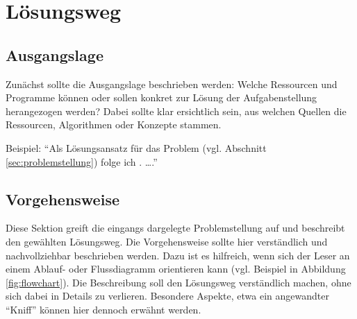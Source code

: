 \documentclass[pagesize=auto, titlepage=on]{scrartcl}
\begin{document}
\section{Lösungsweg}
\label{sec:ansatz}

\subsection{Ausgangslage}
\label{sec:ausgangslage}
Zunächst sollte die Ausgangslage beschrieben werden:
Welche Ressourcen und Programme können oder sollen konkret zur Lösung der Aufgabenstellung herangezogen werden?
Dabei sollte klar ersichtlich sein, aus welchen Quellen die Ressourcen, Algorithmen oder Konzepte stammen.

Beispiel: \enquote{Als Lösungsansatz für das Problem (vgl. Abschnitt \ref{sec:problemstellung})
folge ich \textcite[S.~214]{Manning:Schuetze:1999}. \ldots.}

\subsection{Vorgehensweise}
Diese Sektion greift die eingangs dargelegte Problemstellung auf und beschreibt den gewählten Lösungsweg.
Die Vorgehensweise sollte hier verständlich und nachvollziehbar beschrieben werden.
Dazu ist es hilfreich, wenn sich der Leser an einem Ablauf- oder Flussdiagramm orientieren kann (vgl. Beispiel in Abbildung \ref{fig:flowchart}).
Die Beschreibung soll den Lösungsweg verständlich machen, ohne sich dabei in Details zu verlieren.
Besondere Aspekte, etwa ein angewandter ``Kniff'' können hier dennoch erwähnt werden.

\end{document}
